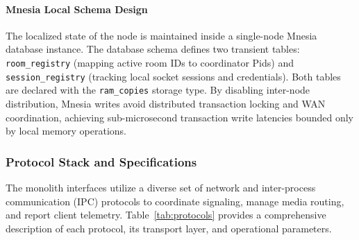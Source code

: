 \documentclass{article}
\begin{document}
\paragraph{Mnesia Local Schema Design}

The localized state of the node is maintained inside a single-node Mnesia database instance.
The database schema defines two transient tables: \texttt{room\_registry} (mapping active
room IDs to coordinator Pids) and \texttt{session\_registry} (tracking local socket sessions
and credentials). Both tables are declared with the \texttt{ram\_copies} storage type.
By disabling inter-node distribution, Mnesia writes avoid distributed transaction locking
and WAN coordination, achieving sub-microsecond transaction write latencies bounded only by local memory operations.

\newpage
\subsubsection{Protocol Stack and Specifications}

The monolith interfaces utilize a diverse set of network and inter-process communication (IPC) protocols
to coordinate signaling, manage media routing, and report client telemetry.
Table~\ref{tab:protocols} provides a comprehensive description of each protocol,
its transport layer, and operational parameters.
\end{document}
